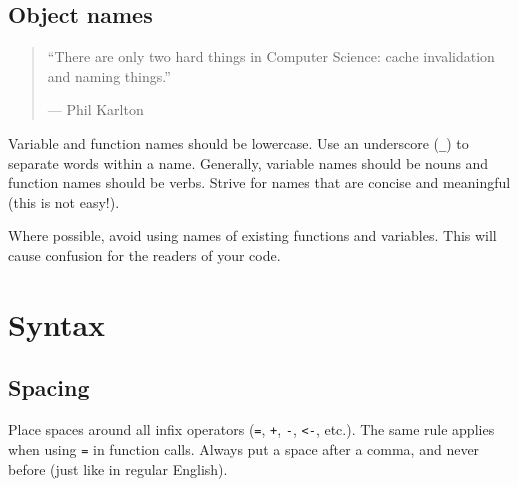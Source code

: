 \subsection{Object names}

\begin{quote}
``There are only two hard things in Computer Science: cache invalidation
and naming things.''

--- Phil Karlton
\end{quote}

Variable and function names should be lowercase. Use an underscore
(\texttt{\_}) to separate words within a name. Generally, variable names
should be nouns and function names should be verbs. Strive for names
that are concise and meaningful (this is not easy!).

\begin{Shaded}
\begin{Highlighting}[]

\end{Highlighting}
\end{Shaded}

Where possible, avoid using names of existing functions and variables.
This will cause confusion for the readers of your code.

\begin{Shaded}
\begin{Highlighting}[]
\StringTok{ }
\StringTok{ }
\StringTok{ }
\end{Highlighting}
\end{Shaded}

\section{Syntax}

\subsection{Spacing}

Place spaces around all infix operators (\texttt{=}, \texttt{+},
\texttt{-}, \texttt{\textless{}-}, etc.). The same rule applies when
using \texttt{=} in function calls. Always put a space after a comma,
and never before (just like in regular English).

